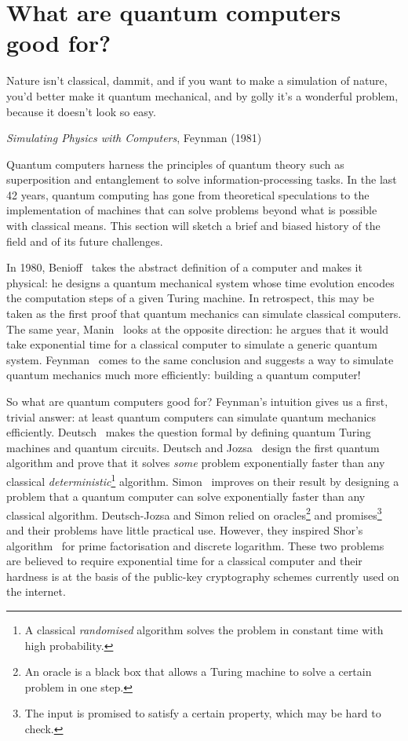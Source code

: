 
\section*{What are quantum computers good for?}
\epigraph{
Nature isn't classical, dammit, and if you want to make a simulation of nature, you'd better make it quantum mechanical, and by golly it's a wonderful problem, because it doesn't look so easy.
}{\textit{Simulating Physics with Computers}, Feynman (1981)}

Quantum computers harness the principles of quantum theory such as superposition and entanglement to solve information-processing tasks.
In the last 42 years, quantum computing has gone from theoretical speculations to the implementation of machines that can solve problems beyond what is possible with classical means.
This section will sketch a brief and biased history of the field and of its future challenges.

In 1980, Benioff~\cite{Benioff80} takes the abstract definition of a computer and makes it physical: he designs a quantum mechanical system whose time evolution encodes the computation steps of a given Turing machine.
In retrospect, this may be taken as the first proof that quantum mechanics can simulate classical computers.
The same year, Manin~\cite{Manin80} looks at the opposite direction: he argues that it would take exponential time for a classical computer to simulate a generic quantum system.
Feynman~\cite{Feynman82,Feynman85} comes to the same conclusion and suggests a way to simulate quantum mechanics much more efficiently: building a quantum computer!

So what are quantum computers good for? Feynman's intuition gives us a
first, trivial answer: at least quantum computers can simulate quantum
mechanics efficiently. Deutsch~\cite{Deutsch85a} makes the question formal by
defining quantum Turing machines and quantum circuits.
Deutsch and Jozsa~\cite{DeutschJozsa92}
design the first quantum algorithm and prove that it solves
\emph{some} problem exponentially faster than any classical
\emph{deterministic}\footnote
{A classical \emph{randomised} algorithm solves the
problem in constant time with high probability.} algorithm.
Simon~\cite{Simon94} improves on their result by designing a problem that a
quantum computer can solve exponentially faster than any classical
algorithm. Deutsch-Jozsa and Simon relied on
oracles\footnote{An oracle is
a black box that allows a Turing machine to solve a certain problem in one step.}
and promises\footnote
{The input is promised to satisfy a certain property, which may be hard to check.}
and their problems have little practical use. However, they inspired Shor's
algorithm~\cite{Shor94a} for prime factorisation and discrete logarithm. These
two problems are believed to require exponential time for a classical
computer and their hardness is at the basis of the public-key
cryptography schemes currently used on the internet.


